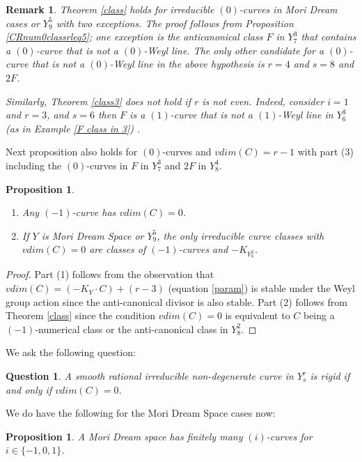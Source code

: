 \documentclass[12pt]{article}
\newtheorem{proposition}[equation]{Proposition}
\newtheorem{remark}[equation]{Remark}
\newtheorem{question}[equation]{Question}
\numberwithin{equation}{section}
\numberwithin{subeq}{equation}
\begin{document}
\begin{remark}\label{rem} Theorem \ref{class} holds for irreducible $(0)$-curves in Mori Dream cases or $Y^5_9$ with two exceptions. The proof follows from  Proposition \ref{CRnum0classrleq5}; one exception is the anticanonical class $F$ in $Y^3_7$ that contains a $(0)$-curve that is not a $(0)$-Weyl line. The only other candidate for a $(0)$-curve that is not a $(0)$-Weyl line in the above hypothesis is $r=4$ and $s=8$ and $2F$.

 Similarly, Theorem \ref{class3} does not hold if $r$ is not even. Indeed, consider $i=1$ and $r=3$, and $s=6$ then $F$ is a $(1)$-curve that is not a $(1)$-Weyl line in $Y^3_6$ (as in Example \ref{F class in 3}) .
\end{remark}



Next proposition also holds for $(0)$-curves and $vdim (C)=r-1$ with part (3) including the $(0)$-curves in $F$ in $Y^3_7$ and $2F$ in $Y^4_8$.

\begin{proposition} \begin{enumerate}
\item Any $(-1)$-curve has $vdim (C)=0$.
\item If $Y$ is Mori Dream Space or $Y^5_9$, the only irreducible curve classes with $vdim (C)=0$ are classes of $(-1)$-curves and $-K_{Y^2_8}$.
\end{enumerate}
\end{proposition}

\begin{proof}
Part (1) follows from the observation that $vdim(C)=(-K_Y \cdot C) + (r-3)$
(equation \ref{param}) is stable under the Weyl group action
since the anti-canonical divisor is also stable.
Part (2) follows from Theorem \ref{class} since the condition $vdim(C)=0$ is equivalent to
$C$ being a $(-1)$-numerical class or the anti-canonical class in $Y^2_8$.
\end{proof}

We ask the following question:
\begin{question}
A smooth rational irreducible non-degenerate curve in $Y^r_s$ is rigid if and only if $vdim(C)=0$.
\end{question}

We do have the following for the Mori Dream Space cases now:

\begin{proposition}\label{fmds}
A Mori Dream space has finitely many $(i)$-curves for $i \in \{-1,0,1\}$.
\end{proposition}
\end{document}
